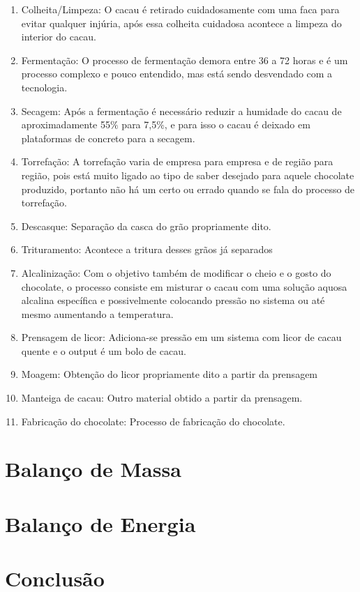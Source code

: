 \documentclass[
	12pt,				%
	openright,			%
	oneside,			%
	a4paper,			%
	english,			%
	french,				%
	spanish,			%
	brazil				%
	]{abntex2}
\begin{document}
\begin{enumerate}
\item Colheita/Limpeza: O cacau é retirado cuidadosamente com uma faca para evitar qualquer injúria, após essa colheita cuidadosa acontece a limpeza do interior do cacau.
\item Fermentação: O processo de fermentação demora entre 36 a 72 horas e é um processo complexo e pouco entendido, mas está sendo desvendado com a tecnologia.
\item Secagem: Após a fermentação é necessário reduzir a humidade do cacau de aproximadamente 55$\%$ para 7,5$\%$, e para isso o cacau é deixado em plataformas de concreto para a secagem.
\item Torrefação: A torrefação varia de empresa para empresa e de região para região, pois está muito ligado ao tipo de saber desejado para aquele chocolate produzido, portanto não há um certo ou errado quando se fala do processo de torrefação.
\item Descasque: Separação da casca do grão propriamente dito.
\item Trituramento: Acontece a tritura desses grãos já separados
\item Alcalinização: Com o objetivo também de modificar o cheio e o gosto do chocolate, o processo consiste em misturar o cacau com uma solução aquosa alcalina específica e possivelmente colocando pressão no sistema ou até mesmo aumentando a temperatura.
\item Prensagem de licor: Adiciona-se pressão em um sistema com licor de cacau quente e o output é um bolo de cacau.
\item Moagem: Obtenção do licor propriamente dito a partir da prensagem
\item Manteiga de cacau: Outro material obtido a partir da prensagem.
\item Fabricação do chocolate: Processo de fabricação do chocolate.
\end{enumerate}


\newpage
\chapter{Balanço de Massa}

\newpage
\chapter{Balanço de Energia}

\newpage
\chapter{Conclusão}


\newpage
\postextual






\end{document}
